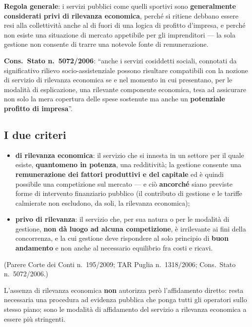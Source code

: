 \textbf{Regola generale}: i servizi pubblici come quelli sportivi sono \textbf{generalmente
considerati privi di rilevanza economica}, perché si ritiene debbano essere resi alla collettività
anche al di fuori di una logica di profitto d'impresa, e perché non esiste una situazione di
mercato appetibile per gli imprenditori --- la sola gestione non consente di trarre una notevole
fonte di remunerazione.

\textbf{Cons.\ Stato n.\ 5072/2006}: ``anche i servizi cosiddetti sociali, connotati da
significativo rilievo socio-assistenziale possono risultare compatibili con la nozione di servizio
di rilevanza economica se e nel momento in cui presentano, per le modalità di esplicazione, una
rilevante componente economica, tesa ad assicurare non solo la mera copertura delle spese sostenute
ma anche un \textbf{potenziale profitto di impresa}''.

\subsection{I due criteri}

\begin{itemize}
  \item \textbf{di rilevanza economica}: il servizio che si innesta in un settore per il quale
    esiste, \textbf{quantomeno in potenza}, una redditività; la gestione consente una
    \textbf{remunerazione dei fattori produttivi e del capitale} ed è quindi possibile una
    competizione sul mercato --- e ciò \textbf{ancorché} siano previste forme di intervento
    finanziario pubblico (il contributo di gestione e le tariffe calmierate non escludono, da
    soli, la rilevanza economica);
  \item \textbf{privo di rilevanza}: il servizio che, per sua natura o per le modalità di
    gestione, \textbf{non dà luogo ad alcuna competizione}, è irrilevante ai fini della
    concorrenza, e la cui gestione deve rispondere al solo principio di \textbf{buon andamento} e
    non anche al necessario equilibrio fra costi e ricavi.
\end{itemize}

(Parere Corte dei Conti n.\ 195/2009; TAR Puglia n.\ 1318/2006; Cons.\ Stato n.\ 5072/2006.)

L'assenza di rilevanza economica \textbf{non} autorizza però l'affidamento diretto: resta
necessaria una procedura ad evidenza pubblica che ponga tutti gli operatori sullo stesso piano;
sono le modalità di affidamento del servizio a rilevanza economica a essere più stringenti.


